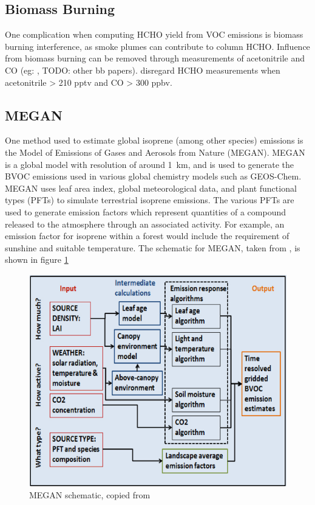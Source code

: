   \subsection{Biomass Burning}
    One complication when computing HCHO yield from VOC emissions is biomass burning interference, as smoke plumes can contribute to column HCHO.
    Influence from biomass burning can be removed through measurements of acetonitrile and CO (eg: \citep{Wolfe2016}, TODO: other bb papers).
    \citet{Wolfe2016} disregard HCHO measurements when acetonitrile > 210 pptv and CO > 300 ppbv.
    
  \subsection{MEGAN}
    One method used to estimate global isoprene (among other species) emissions is the Model of Emissions of Gases and Aerosols from Nature (MEGAN). 
    MEGAN is a global model with resolution of around 1~km, and is used to generate the BVOC emissions used in various global chemistry models such as GEOS-Chem.
    MEGAN uses leaf area index, global meteorological data, and plant functional types (PFTs) to simulate terrestrial isoprene emissions.
    The various PFTs are used to generate emission factors which represent quantities of a compound released to the atmosphere through an associated activity.
    For example, an emission factor for isoprene within a forest would include the requirement of sunshine and suitable temperature.
    The schematic for MEGAN, taken from \citet{Megan_Website}, is shown in figure \ref{ch_HCHO:fig:megan_schematic}
    
    \begin{figure}[!htbp]
      \includegraphics[width=\textwidth]{Figures/MEGANmodel_img.jpg}
      \caption{MEGAN schematic, copied from \citet{Megan_Website}}
      \label{ch_HCHO:fig:megan_schematic}
    \end{figure}


